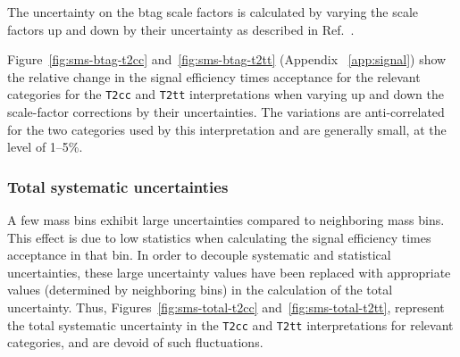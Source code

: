 The uncertainty on the btag scale factors is calculated by varying the 
scale factors up and down by their uncertainty as described in Ref.~\cite{btagpogtwiki}.

Figure~\ref{fig:sms-btag-t2cc} and~\ref{fig:sms-btag-t2tt} (Appendix ~\ref{app:signal})
show the relative change in the signal efficiency times acceptance for 
the relevant categories for the \verb!T2cc! and \verb!T2tt! interpretations
when varying up and down the scale-factor corrections by their uncertainties. 
The variations  are anti-correlated for the two \nb categories used by this
interpretation and are generally small, at the level of 1--5\%.

\subsubsection{Total systematic uncertainties\label{sec:total-sms-unc}}

A few mass bins exhibit large uncertainties compared to neighboring 
mass bins. This effect is due to low statistics when calculating the signal
efficiency times acceptance in that bin. In order to decouple systematic
and statistical uncertainties, these large uncertainty values have been replaced with appropriate 
values (determined by neighboring bins) in the calculation of the
total uncertainty. Thus, Figures~\ref{fig:sms-total-t2cc} and~\ref{fig:sms-total-t2tt}, 
represent the total systematic uncertainty in the \verb!T2cc! and \verb!T2tt! interpretations
for relevant categories, and are devoid of such fluctuations.

